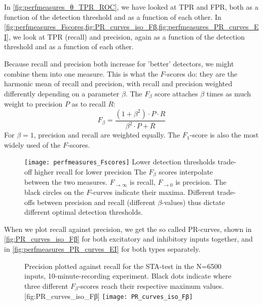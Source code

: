 In \cref{fig:perfmeasures_θ_TPR_ROC}, we have looked at TPR and FPR, both as a function of the detection threshold and as a function of each other. In \cref{fig:perfmeasures_Fscores,fig:PR_curves_iso_Fβ,fig:perfmeasures_PR_curves_EI}, we look at TPR (recall) and precision, again as a function of the detection threshold and as a function of each other.

Because recall and precision both increase for 'better' detectors, we might combine them into one measure. This is what the $F$-scores do: they are the harmonic mean of recall and precision, with recall and precision weighted differently depending on a parameter $β$. The $F_β$ score attaches $β$ times as much weight to precision $P$ as to recall $R$:
\begin{equation}
    F_β = \frac{(1+β^2) · P · R}{β^2 · P + R}
\end{equation}
For $β = 1$, precision and recall are weighted equally. The $F_1$-score is also the most widely used of the $F$-scores.


\begin{figure}
    \texttt{[image: perfmeasures\_Fscores]}
    \captionn
        {Lower detection thresholds trade-off higher recall for lower precision}
        {The $F_β$ scores interpolate between the two measures. $F_{→∞}$ is recall, $F_{→0}$ is precision. The black circles on the $F$-curves indicate their maxima. Different trade-offs between precision and recall (different $β$-values) thus dictate different optimal detection thresholds.}
    \label{fig:perfmeasures_Fscores}
\end{figure}

When we plot recall against precision, we get the so called PR-curves, shown in \cref{fig:PR_curves_iso_Fβ} for both excitatory and inhibitory inputs together, and in \cref{fig:perfmeasures_PR_curves_EI} for both types separately.


\begin{figure}
    \begin{sidecaption}
        {Precision plotted against recall for the STA-test in the N=6500 inputs, 10-minute-recording experiment. Black dots indicate where three different $F_β$-scores reach their respective maximum values.}
        [fig:PR_curves_iso_Fβ]
        \texttt{[image: PR\_curves\_iso\_Fβ]}
    \end{sidecaption}
\end{figure}

